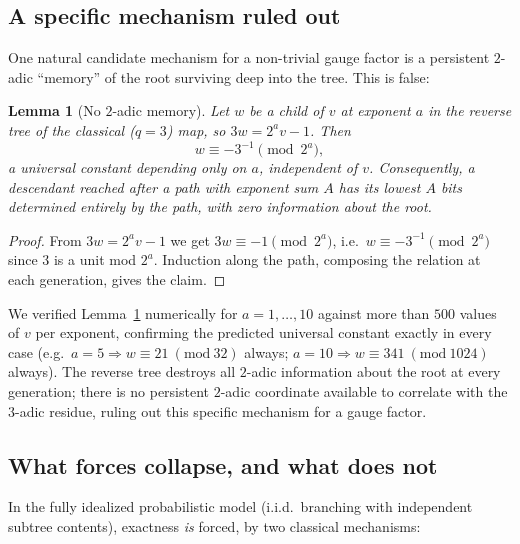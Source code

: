 \documentclass[11pt]{article}
\newtheorem{lemma}[theorem]{Lemma}
\theoremstyle{definition}
\theoremstyle{remark}
\begin{document}
\subsection{A specific mechanism ruled out}

One natural candidate mechanism for a non-trivial gauge factor is a
persistent $2$-adic ``memory'' of the root surviving deep into the
tree. This is false:

\begin{lemma}[No $2$-adic memory]\label{lem:2adic}
Let $w$ be a child of $v$ at exponent $a$ in the reverse tree of the
classical ($q=3$) map, so $3w=2^a v - 1$. Then
\[
  w \equiv -3^{-1} \pmod{2^a},
\]
a universal constant depending only on $a$, independent of $v$.
Consequently, a descendant reached after a path with exponent sum $A$
has its lowest $A$ bits determined \emph{entirely by the path}, with
zero information about the root.
\end{lemma}

\begin{proof}
From $3w=2^av-1$ we get $3w\equiv -1\pmod{2^a}$, i.e.\ $w\equiv
-3^{-1}\pmod{2^a}$ since $3$ is a unit mod $2^a$. Induction along the
path, composing the relation at each generation, gives the claim.
\end{proof}

We verified Lemma~\ref{lem:2adic} numerically for $a=1,\dots,10$ against
more than $500$ values of $v$ per exponent, confirming the predicted
universal constant exactly in every case (e.g.\ $a=5\Rightarrow w\equiv
21\ (\mathrm{mod}\ 32)$ always; $a=10\Rightarrow w\equiv 341\
(\mathrm{mod}\ 1024)$ always). The reverse tree destroys all $2$-adic
information about the root at every generation; there is no persistent
$2$-adic coordinate available to correlate with the $3$-adic residue,
ruling out this specific mechanism for a gauge factor.

\subsection{What forces collapse, and what does not}

In the fully idealized probabilistic model (i.i.d.\ branching with
independent subtree contents), exactness \emph{is} forced, by two
classical mechanisms:
\end{document}
